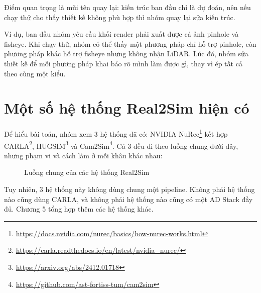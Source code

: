 Điểm quan trọng là mũi tên quay lại: kiến trúc ban đầu chỉ là dự đoán, nên nếu chạy thử cho thấy thiết kế không phù hợp thì nhóm quay lại sửa kiến trúc.

Ví dụ, ban đầu nhóm yêu cầu khối render phải xuất được cả ảnh pinhole và fisheye.
Khi chạy thử, nhóm có thể thấy một phương pháp chỉ hỗ trợ pinhole, còn phương pháp khác hỗ trợ fisheye nhưng không nhận LiDAR.
Lúc đó, nhóm sửa thiết kế để mỗi phương pháp khai báo rõ mình làm được gì, thay vì ép tất cả theo cùng một kiểu.

\section{Một số hệ thống Real2Sim hiện có}

Để hiểu bài toán, nhóm xem 3 hệ thống đã có: NVIDIA NuRec\footnote{\url{https://docs.nvidia.com/nurec/basics/how-nurec-works.html}} kết hợp CARLA\footnote{\url{https://carla.readthedocs.io/en/latest/nvidia_nurec/}}, HUGSIM\footnote{\url{https://arxiv.org/abs/2412.01718}} và Cam2Sim\footnote{\url{https://github.com/ast-fortiss-tum/cam2sim}}.
Cả 3 đều đi theo luồng chung dưới đây, nhưng phạm vi và cách làm ở mỗi khâu khác nhau:

\begin{figure}[H]
  \centering
  \caption{Luồng chung của các hệ thống Real2Sim}
\end{figure}

Tuy nhiên, 3 hệ thống này không dùng chung một pipeline.
Không phải hệ thống nào cũng dùng CARLA, và không phải hệ thống nào cũng có một AD Stack đầy đủ. Chương 5 tổng hợp thêm các hệ thống khác.

